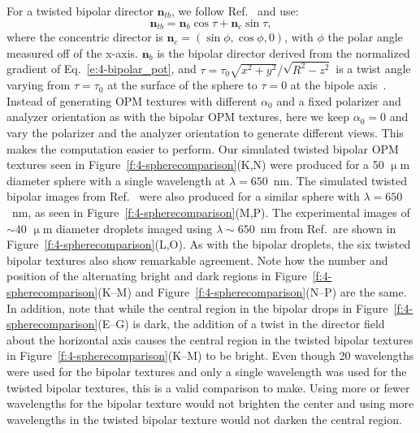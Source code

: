 For a twisted bipolar director $\mathbf{n}_{tb}$, we follow Ref.~\cite{RN177} and use:
\begin{equation}
\mathbf{n}_{tb} = \mathbf{n}_{b}\cos\tau +\mathbf{n}_{c}\sin\tau,
\end{equation}
where the concentric director is $\mathbf{n}_{c} = (\sin \phi,\cos \phi,0)$, with $\phi$ the polar angle measured off of the x-axis.
$\mathbf{n}_b$ is the bipolar director derived from the normalized gradient of Eq.~\ref{e:4-bipolar_pot}, and $\tau = \tau_0\sqrt{x^2+y^2}/\sqrt{R^2-z^2}$ is a twist angle varying from $\tau=\tau_0$ at the surface of the sphere to $\tau=0$ at the bipole axis~\cite{RN177}.
Instead of generating OPM textures with different $\alpha_0$ and a fixed polarizer and analyzer orientation as with the bipolar OPM textures, here we keep $\alpha_0=0$ and vary the polarizer and the analyzer orientation to generate different views.
This makes the computation easier to perform. Our simulated twisted bipolar OPM textures seen in Figure~\ref{f:4-spherecomparison}(K,N) were produced for a 50 $\upmu$m diameter sphere with a single wavelength at $\lambda = 650$~nm.
The simulated twisted bipolar images from Ref.~\cite{RN193} were also produced for a similar sphere with $\lambda = 650$~nm, as seen in Figure~\ref{f:4-spherecomparison}(M,P).
The experimental images of $\sim 40$ $\upmu$m diameter droplets imaged using $\lambda \sim 650$~nm from Ref.~\cite{RN193}are shown in Figure~\ref{f:4-spherecomparison}(L,O).
As with the bipolar droplets, the six twisted bipolar textures also show remarkable agreement.
Note how the number and position of the alternating bright and dark regions in Figure~\ref{f:4-spherecomparison}(K--M) and Figure~\ref{f:4-spherecomparison}(N--P) are the same.
In addition, note that while the central region in the bipolar drops in Figure~\ref{f:4-spherecomparison}(E--G) is dark, the addition of a twist in the director field about the horizontal axis causes the central region in the twisted bipolar textures in Figure~\ref{f:4-spherecomparison}(K--M) to be bright.
Even though 20 wavelengths were used for the bipolar textures and only a single wavelength was used for the twisted bipolar textures, this is a valid comparison to make.
Using more or fewer wavelengths for the bipolar texture would not brighten the center and using more wavelengths in the twisted bipolar texture would not darken the central region.


